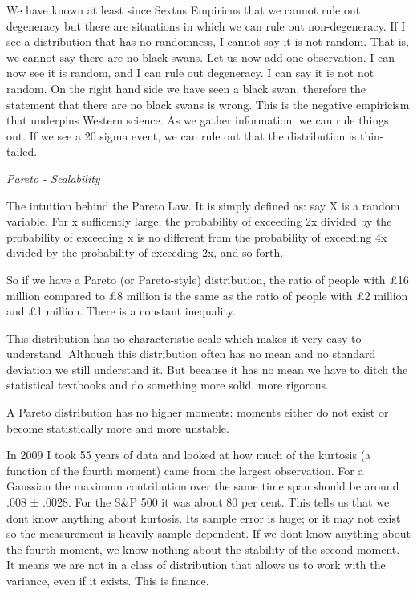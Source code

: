 \documentclass[
]{book}
\begin{document}
We have known at least since Sextus Empiricus that we
cannot rule out degeneracy but there are situations in which
we can rule out non-degeneracy. If I see a distribution that
has no randomness, I cannot say it is not random. That is,
we cannot say there are no black swans. Let us now add
one observation. I can now see it is random, and I can
rule out degeneracy. I can say it is not not random. On the
right hand side we have seen a black swan, therefore the
statement that there are no black swans is wrong. This is the
negative empiricism that underpins Western science. As we
gather information, we can rule things out.
If we see a 20 sigma event, we can rule out that the
distribution is thin-tailed.

\emph{Pareto - Scalability}

The intuition behind the Pareto Law. It is simply defined as:
say X is a random variable.
For x sufficently large, the probability of exceeding 2x divided by the
probability of exceeding x is no different from the probability
of exceeding 4x divided by the probability of exceeding 2x,
and so forth.

So if we have a Pareto (or Pareto-style) distribution, the ratio
of people with £16 million compared to £8 million is the same
as the ratio of people with £2 million and £1 million. There
is a constant inequality.

This distribution has no characteristic
scale which makes it very easy to understand. Although this
distribution often has no mean and no standard deviation we
still understand it. But because it has no mean we have to
ditch the statistical textbooks and do something more solid,
more rigorous.

A Pareto distribution has no higher moments: moments
either do not exist or become statistically more and more
unstable.

In 2009 I took 55 years of data and
looked at how much of the kurtosis (a function of the fourth
moment) came from the largest observation. For
a Gaussian the maximum contribution over the same time span
should be around .008 ± .0028. For the S\&P 500 it was about
80 per cent. This tells us that we dont know anything about
kurtosis. Its sample error is huge; or it may not exist so the
measurement is heavily sample dependent. If we dont know
anything about the fourth moment, we know nothing about the
stability of the second moment. It means we are not in a class
of distribution that allows us to work with the variance, even
if it exists. This is finance.
\end{document}
